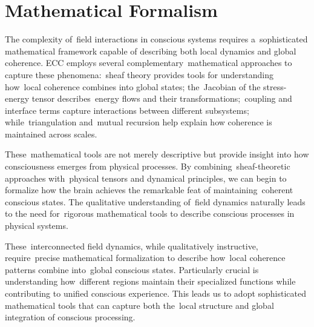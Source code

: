\section{Mathematical Formalism~}

The complexity of~field interactions in conscious systems requires a~sophisticated mathematical framework capable of describing both local dynamics and global coherence. ECC employs several complementary~mathematical approaches to capture these phenomena:~sheaf theory provides tools for understanding how~local coherence combines into global states; the~Jacobian of the stress-energy tensor describes~energy flows and their transformations;~coupling and interface terms capture interactions between different subsystems; while~triangulation and~mutual recursion help explain how coherence is maintained across scales.

These~mathematical tools are not merely descriptive but provide insight into how consciousness emerges from physical processes. By combining~sheaf-theoretic approaches with~physical tensors and dynamical principles, we can begin to formalize how the brain achieves the remarkable feat of maintaining~coherent conscious states. The qualitative understanding of~field dynamics naturally leads to the need for~rigorous mathematical tools to describe conscious processes in physical systems.

These~interconnected field dynamics, while qualitatively instructive, require~precise mathematical formalization to describe how~local coherence patterns combine into~global conscious states. Particularly crucial is understanding how~different regions maintain their specialized functions while contributing to unified conscious experience. This leads us to adopt sophisticated mathematical tools that can capture both the~local structure and global integration of conscious processing.
